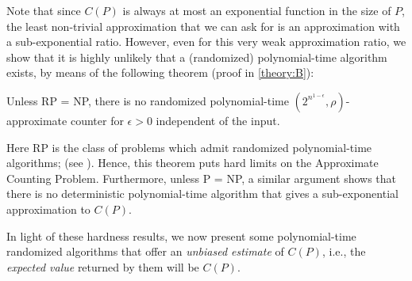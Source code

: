 \documentclass[acmsmall]{acmart}
\def\RM#1{{\textcolor{red}{\textbf{RM:} #1}}}
\renewcommand{\RM}[1]{}
\newtheorem{problem}{Problem}
\begin{document}
Note that since $C(P)$ is always at most an exponential function in the size of $P$,
the least non-trivial approximation that we can ask for is an approximation
with a sub-exponential ratio. 
However, even for this very weak approximation ratio, we show that it is highly unlikely that a (randomized) polynomial-time algorithm exists, by means of the following theorem
(proof in \cref{theory:B}):

\begin{theorem}\label{thm:approximate-counting-problem-hardness}
 Unless RP = NP, there is no randomized polynomial-time $(2^{n^{1-\epsilon}}, \rho)$-approximate 
 counter for $\epsilon > 0$ independent of the input.
\end{theorem}

Here RP is the class of problems which admit randomized polynomial-time algorithms;
(see \cite{aroraBarak}). Hence, this theorem puts hard limits on the Approximate Counting Problem. 
Furthermore, unless P = NP, a similar argument shows that there is no deterministic polynomial-time
algorithm that gives a sub-exponential approximation to $C(P)$. 

In light of these hardness results, we now present some polynomial-time randomized algorithms that offer an \emph{unbiased estimate} of $C(P)$, i.e., the \emph{expected value} returned by them will be $C(P)$. 





\end{document}

